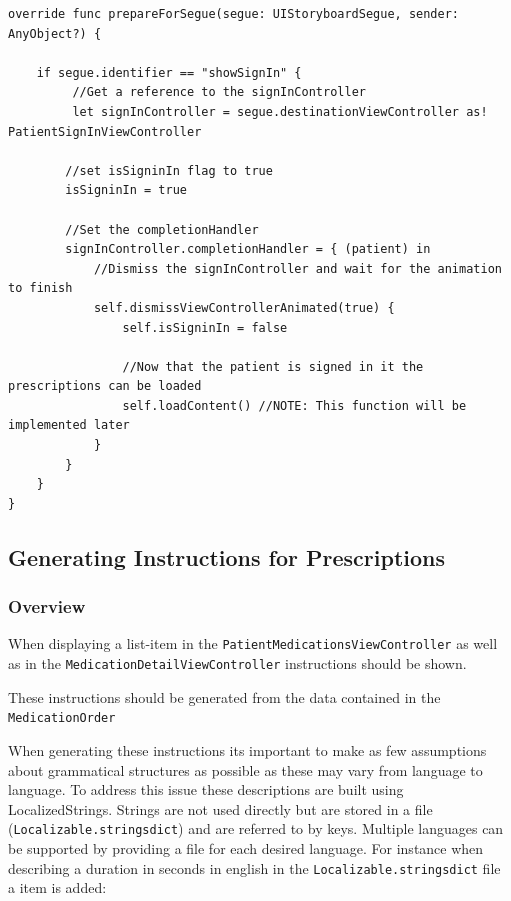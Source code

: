 \documentclass{article}
\begin{document}
\begin{verbatim}
override func prepareForSegue(segue: UIStoryboardSegue, sender: AnyObject?) {

    if segue.identifier == "showSignIn" {
         //Get a reference to the signInController
         let signInController = segue.destinationViewController as! PatientSignInViewController

        //set isSigninIn flag to true
        isSigninIn = true

        //Set the completionHandler
        signInController.completionHandler = { (patient) in
            //Dismiss the signInController and wait for the animation to finish
            self.dismissViewControllerAnimated(true) {
                self.isSigninIn = false

                //Now that the patient is signed in it the prescriptions can be loaded
                self.loadContent() //NOTE: This function will be implemented later
            }
        }
    }
}
\end{verbatim}

\subsection{Generating Instructions for Prescriptions}\label{step-6.3---implementing-patientmedicationsviewcontroller---generating-instructions-for-prescriptions}

\subsubsection{Overview}
When displaying a list-item in the
\texttt{PatientMedicationsViewController} as well as in the
\texttt{MedicationDetailViewController} instructions should be shown.

These instructions should be generated from the data contained in the
\texttt{MedicationOrder}

When generating these instructions its important to make as few
assumptions about grammatical structures as possible as these may vary
from language to language.
To address this issue these descriptions are built using
LocalizedStrings.
Strings are not used directly but are stored in a file
(\texttt{Localizable.stringsdict}) and are referred to by keys.
Multiple languages can be supported by providing a file for each desired
language.
For instance when describing a duration in seconds in english in the \texttt{Localizable.stringsdict} file a item is added:
\end{document}
